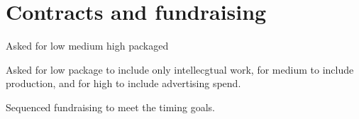 \documentclass[
  letterpaper,
  DIV=11,
  numbers=noendperiod,
  oneside]{scrreprt}
\begin{document}
\hypertarget{contracts-and-fundraising}{%
\section{Contracts and fundraising}\label{contracts-and-fundraising}}

Asked for low medium high packaged

Asked for low package to include only intellecgtual work, for medium to
include production, and for high to include advertising spend.

Sequenced fundraising to meet the timing goals.
\end{document}
